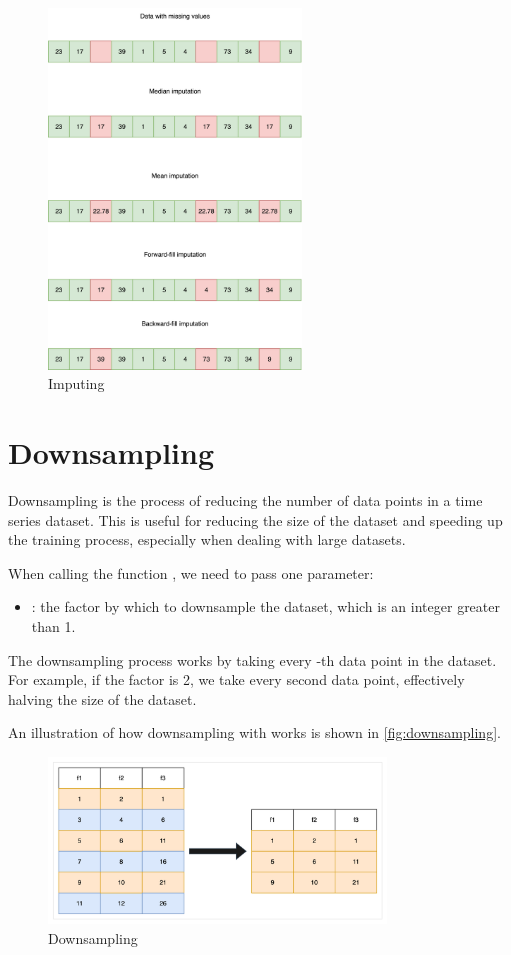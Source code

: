 \documentclass[review]{AIM_report}
\begin{document}
\begin{figure}
    \centering
    \includegraphics[width=0.6\textwidth]{files/imputing/imputation.png}
    \caption{Imputing}
    \label{fig:imputing}
\end{figure}


\newpage
\section{Downsampling}
\label{sec:downsampling}

Downsampling is the process of reducing the number of data points in a time series dataset. This is useful for reducing the size of the dataset and speeding up the training process, especially when dealing with large datasets.

When calling the function \downsample, we need to pass one parameter:
\begin{itemize}
    \item \factor: the factor by which to downsample the dataset, which is an integer greater than 1.
\end{itemize}

The downsampling process works by taking every \factor-th data point in the dataset. For example, if the factor is 2, we take every second data point, effectively halving the size of the dataset.

An illustration of how downsampling with  works is shown in \autoref{fig:downsampling}.
\begin{figure}
    \centering
    \includegraphics[width=0.8\textwidth]{files/downsampling/downsampling.png}
    \caption{Downsampling}
    \label{fig:downsampling}
\end{figure}
\end{document}

